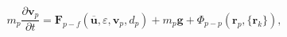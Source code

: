 \begin{equation}
m_p \frac{\partial \mathbf{v}_p}{\partial t} = 
\mathbf{F}_{p-f}(\mathbf{\overline{u}}, \varepsilon,
\mathbf{v}_p, d_p) + m_p \mathbf{g} + \Phi_{p-p}(\mathbf{r}_p, \{\mathbf{r}_k
\}),
\label{equ:equationofmotion}
\end{equation}
